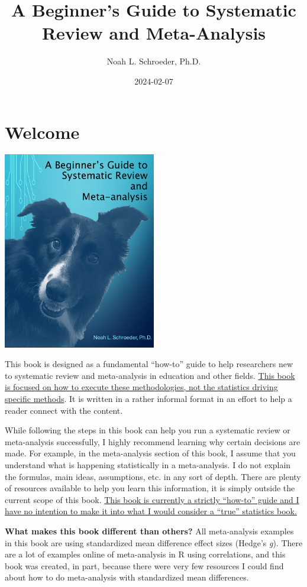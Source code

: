 \documentclass[
]{book}
\title{A Beginner's Guide to Systematic Review and Meta-Analysis}
\author{Noah L. Schroeder, Ph.D.}
\date{2024-02-07}
\begin{document}
\maketitle

{
\setcounter{tocdepth}{1}
\tableofcontents
}
\hypertarget{welcome}{%
\chapter*{Welcome}\label{welcome}}

\includegraphics[width=0.5\textwidth,height=\textheight]{images/cover.png}

This book is designed as a fundamental ``how-to'' guide to help researchers new to systematic review and meta-analysis in education and other fields. \ul{This book is focused on how to execute these methodologies, not the statistics driving specific methods}. It is written in a rather informal format in an effort to help a reader connect with the content.

While following the steps in this book can help you run a systematic review or meta-analysis successfully, I highly recommend learning why certain decisions are made. For example, in the meta-analysis section of this book, I assume that you understand what is happening statistically in a meta-analysis. I do not explain the formulas, main ideas, assumptions, etc. in any sort of depth. There are plenty of resources available to help you learn this information, it is simply outside the current scope of this book. \ul{This book is currently a strictly ``how-to'' guide and I have no intention to make it into what I would consider a ``true'' statistics book.}

\textbf{What makes this book different than others?} All meta-analysis examples in this book are using standardized mean difference effect sizes (Hedge's \emph{g}). There are a lot of examples online of meta-analysis in R using correlations, and this book was created, in part, because there were very few resources I could find about how to do meta-analysis with standardized mean differences.
\end{document}
